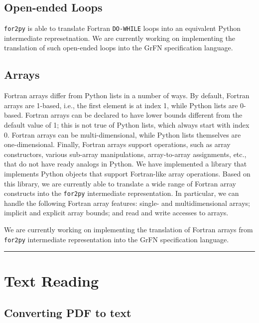 \documentclass[article, 12pt, oneside]{memoir}
\begin{document}
\hypertarget{open-ended-loops}{%
\subsection{Open-ended Loops}\label{open-ended-loops}}

\texttt{for2py} is able to translate Fortran \texttt{DO-WHILE} loops
into an equivalent Python intermediate represetnation. We are currently
working on implementing the translation of such open-ended loops into
the GrFN specification language.

\hypertarget{arrays}{%
\subsection{Arrays}\label{arrays}}

Fortran arrays differ from Python lists in a number of ways. By default,
Fortran arrays are 1-based, i.e., the first element is at index 1, while
Python lists are 0-based. Fortran arrays can be declared to have lower
bounds different from the default value of 1; this is not true of Python
lists, which always start with index 0. Fortran arrays can be
multi-dimensional, while Python lists themselves are one-dimensional.
Finally, Fortran arrays support operations, such as array constructors,
various sub-array manipulations, array-to-array assignments, etc., that
do not have ready analogs in Python. We have implemented a library that
implements Python objects that support Fortran-like array operations.
Based on this library, we are currently able to translate a wide range
of Fortran array constructs into the \texttt{for2py} intermediate
representation. In particular, we can handle the following Fortran array
features: single- and multidimensional arrays; implicit and explicit
array bounds; and read and write accesses to arrays.

We are currently working on implementing the translation of Fortran
arrays from \texttt{for2py} intermediate representation into the GrFN
specification language.

\begin{center}\rule{0.5\linewidth}{\linethickness}\end{center}

\hypertarget{text-reading}{%
\section{Text Reading}\label{text-reading}}

\hypertarget{converting-pdf-to-text}{%
\subsection{Converting PDF to text}\label{converting-pdf-to-text}}
\end{document}
